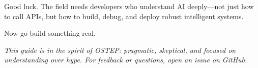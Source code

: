 \documentclass[11pt,oneside]{book}
\begin{document}
Good luck. The field needs developers who understand AI deeply—not just how to call APIs, but how to build, debug, and deploy robust intelligent systems.

Now go build something real.

\vspace{1cm}

\noindent\textit{This guide is in the spirit of OSTEP: pragmatic, skeptical, and focused on understanding over hype. For feedback or questions, open an issue on GitHub.}

\end{document}
